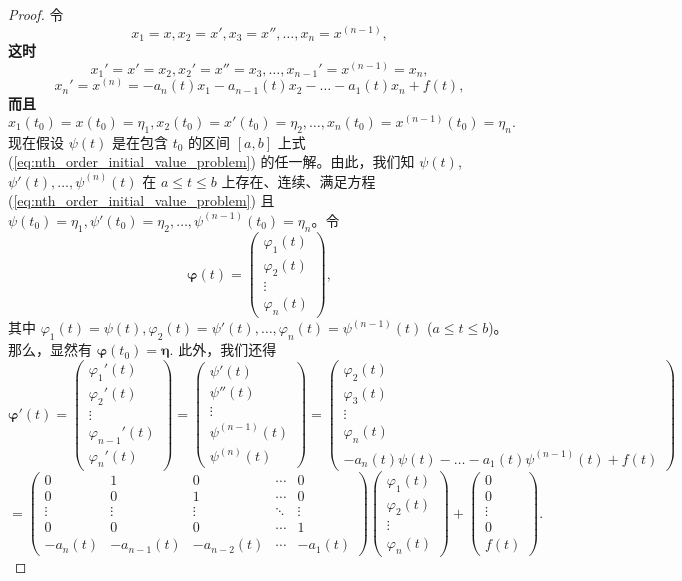 \begin{proof}令
$$x_1=x, x_2=x', x_3=x'', \dots, x_n=x^{(n-1)},$$
\textbf{这时}
$$x_1'=x'=x_2, x_2'=x''=x_3, \dots, x_{n-1}'=x^{(n-1)}=x_n,$$
$$x_n'=x^{(n)}=-a_n(t)x_1-a_{n-1}(t)x_2-\dots-a_1(t)x_n+f(t),$$
\textbf{而且}
$$x_1(t_0)=x(t_0)=\eta_1, x_2(t_0)=x'(t_0)=\eta_2, \dots, x_n(t_0)=x^{(n-1)}(t_0)=\eta_n.$$
现在假设 $\psi(t)$ 是在包含 $t_0$ 的区间 $[a,b]$ 上式 (\ref{eq:nth_order_initial_value_problem}) 的任一解。由此，我们知 $\psi(t)$,
$\psi'(t), \dots, \psi^{(n)}(t)$ 在 $a \le t \le b$ 上存在、连续、满足方程 (\ref{eq:nth_order_initial_value_problem}) 且 $\psi(t_0)=\eta_1, \psi'(t_0)=
\eta_2, \dots, \psi^{(n-1)}(t_0)=\eta_n$。令
$$\boldsymbol{\varphi}(t) = \begin{pmatrix}
\varphi_1(t) \\ \varphi_2(t) \\ \vdots \\ \varphi_n(t)
\end{pmatrix},$$
其中 $\varphi_1(t)=\psi(t), \varphi_2(t)=\psi'(t), \dots, \varphi_n(t)=\psi^{(n-1)}(t)$ ($a \le t \le b$)。那么，显然有 $\boldsymbol{\varphi}(t_0) = \boldsymbol{\eta}$.
此外，我们还得
$$\boldsymbol{\varphi}'(t) = \begin{pmatrix}
\varphi_1'(t) \\ \varphi_2'(t) \\ \vdots \\ \varphi_{n-1}'(t) \\ \varphi_n'(t)
\end{pmatrix} = \begin{pmatrix}
\psi'(t) \\ \psi''(t) \\ \vdots \\ \psi^{(n-1)}(t) \\ \psi^{(n)}(t)
\end{pmatrix} = \begin{pmatrix}
\varphi_2(t) \\ \varphi_3(t) \\ \vdots \\ \varphi_n(t) \\ -a_n(t)\psi(t)-\dots-a_1(t)\psi^{(n-1)}(t)+f(t)
\end{pmatrix}$$
$$= \begin{pmatrix}
0 & 1 & 0 & \cdots & 0 \\
0 & 0 & 1 & \cdots & 0 \\
\vdots & \vdots & \vdots & \ddots & \vdots \\
0 & 0 & 0 & \cdots & 1 \\
-a_n(t) & -a_{n-1}(t) & -a_{n-2}(t) & \cdots & -a_1(t)
\end{pmatrix}\begin{pmatrix} \varphi_1(t) \\ \varphi_2(t) \\ \vdots \\ \varphi_n(t) \end{pmatrix} + \begin{pmatrix} 0 \\ 0 \\ \vdots \\ 0 \\ f(t) \end{pmatrix}.$$


\end{proof}
